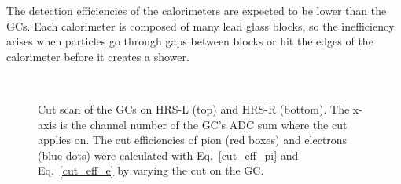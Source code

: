  The detection efficiencies of the calorimeters are expected to be lower than the GCs. Each calorimeter is composed of many lead glass blocks, so the inefficiency arises when particles go through gaps between blocks or hit the edges of the calorimeter before it creates a shower. 
\begin{figure}[!ht]
  \begin{center}
      \\
      \caption[Cut scan of the GCs]{\footnotesize{Cut scan of the GCs on HRS-L (top) and HRS-R (bottom). The x-axis is the channel number of the GC's ADC sum where the cut applies on. The cut efficiencies of pion (red boxes) and electrons (blue dots) were calculated with Eq.~\eqref{cut_eff_pi} and Eq.~\eqref{cut_eff_e} by varying the cut on the GC.} }
     \label{gc_cut_scan}
  \end{center}
\end{figure}

